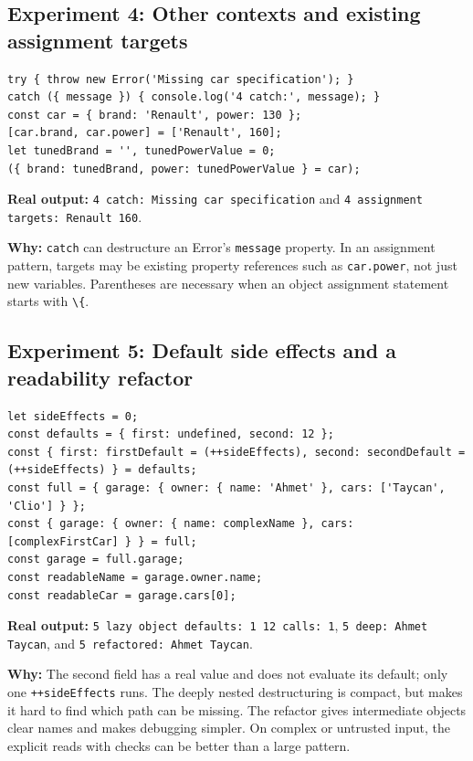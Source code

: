 \documentclass[
  9pt,
]{article}
\newcommand{\passthrough}[1]{#1}
\begin{document}
\subsection{Experiment 4: Other contexts and existing assignment
targets}\label{experiment-4-other-contexts-and-existing-assignment-targets}

\begin{lstlisting}
try { throw new Error('Missing car specification'); }
catch ({ message }) { console.log('4 catch:', message); }
const car = { brand: 'Renault', power: 130 };
[car.brand, car.power] = ['Renault', 160];
let tunedBrand = '', tunedPowerValue = 0;
({ brand: tunedBrand, power: tunedPowerValue } = car);
\end{lstlisting}

\textbf{Real output:}
\passthrough{\lstinline!4 catch: Missing car specification!} and
\passthrough{\lstinline!4 assignment targets: Renault 160!}.

\textbf{Why:} \passthrough{\lstinline!catch!} can destructure an Error's
\passthrough{\lstinline!message!} property. In an assignment pattern,
targets may be existing property references such as
\passthrough{\lstinline!car.power!}, not just new variables. Parentheses
are necessary when an object assignment statement starts with
\passthrough{\lstinline!\{!}.

\subsection{Experiment 5: Default side effects and a readability
refactor}\label{experiment-5-default-side-effects-and-a-readability-refactor}

\begin{lstlisting}
let sideEffects = 0;
const defaults = { first: undefined, second: 12 };
const { first: firstDefault = (++sideEffects), second: secondDefault = (++sideEffects) } = defaults;
const full = { garage: { owner: { name: 'Ahmet' }, cars: ['Taycan', 'Clio'] } };
const { garage: { owner: { name: complexName }, cars: [complexFirstCar] } } = full;
const garage = full.garage;
const readableName = garage.owner.name;
const readableCar = garage.cars[0];
\end{lstlisting}

\textbf{Real output:}
\passthrough{\lstinline!5 lazy object defaults: 1 12 calls: 1!},
\passthrough{\lstinline!5 deep: Ahmet Taycan!}, and
\passthrough{\lstinline!5 refactored: Ahmet Taycan!}.

\textbf{Why:} The second field has a real value and does not evaluate
its default; only one \passthrough{\lstinline!++sideEffects!} runs. The
deeply nested destructuring is compact, but makes it hard to find which
path can be missing. The refactor gives intermediate objects clear names
and makes debugging simpler. On complex or untrusted input, the explicit
reads with checks can be better than a large pattern.
\end{document}
